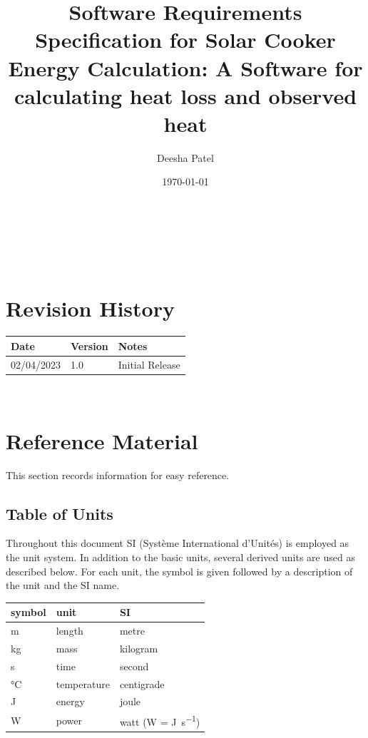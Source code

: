 \documentclass[12pt]{article}
\begin{document}
\title{Software Requirements Specification for Solar Cooker Energy Calculation: A Software for calculating heat loss and observed heat} 
\author{Deesha Patel}
\date{\today}
	
\maketitle

~\newpage


\tableofcontents

~\newpage

\section*{Revision History}

\begin{tabularx}{\textwidth}{p{3cm}p{2cm}X}
\toprule {\bf Date} & {\bf Version} & {\bf Notes}\\
\midrule
02/04/2023 & 1.0 & Initial Release\\

\bottomrule
\end{tabularx}

~\newpage

\section{Reference Material}

This section records information for easy reference.

\subsection{Table of Units}

Throughout this document SI (Syst\`{e}me International d'Unit\'{e}s) is employed
as the unit system.  In addition to the basic units, several derived units are
used as described below.  For each unit, the symbol is given followed by a
description of the unit and the SI name.
~\newline

\renewcommand{\arraystretch}{1.2}
  \noindent \begin{tabular}{l l l} 
    \toprule		
    \textbf{symbol} & \textbf{unit} & \textbf{SI}\\
    \midrule 
    \si{\metre} & length & metre\\
    \si{\kilogram} & mass	& kilogram\\
    \si{\second} & time & second\\
    \si{\celsius} & temperature & centigrade\\
    \si{\joule} & energy & joule\\
    \si{\watt} & power & watt (W = \si{\joule\per\second})\\
    \bottomrule
  \end{tabular}
\end{document}
